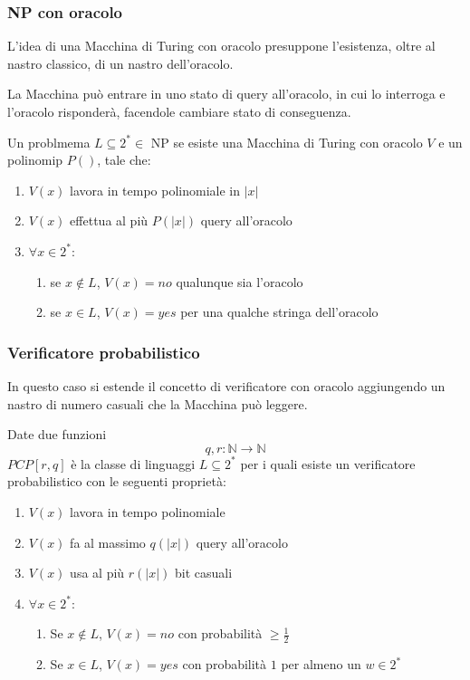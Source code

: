 \subsubsection{NP con oracolo}
L'idea di una Macchina di Turing con oracolo presuppone l'esistenza, oltre 
al nastro classico, di un nastro dell'oracolo.

La Macchina può entrare in uno stato di query all'oracolo, 
in cui lo interroga e l'oracolo risponderà, facendole cambiare stato di conseguenza.

\begin{theorem}
    Un problmema $L \subseteq 2^* \in $ NP se esiste una Macchina di Turing con oracolo $V$ e
    un polinomip $P()$, tale che:
    \begin{enumerate}
        \item $V(x)$ lavora in tempo polinomiale in $|x|$
        \item $V(x)$ effettua al più $P(|x|)$ query all'oracolo
        \item $\forall x \in 2^*$:
        \begin{enumerate}
            \item se $x \notin L$, $V(x) = no$ qualunque sia l'oracolo
            \item se $x \in L$, $V(x) = yes$ per una qualche stringa dell'oracolo
        \end{enumerate}
    \end{enumerate}
\end{theorem}

\subsubsection{Verificatore probabilistico}
In questo caso si estende il concetto di verificatore con 
oracolo aggiungendo un nastro di numero casuali che la Macchina può leggere.

Date due funzioni 
$$q,r : \mathbb{N} \longrightarrow \mathbb{N}$$
$PCP[r,q]$ è la classe di linguaggi $L \subseteq 2^*$ per i quali esiste un verificatore probabilistico
con le seguenti proprietà: 
\begin{enumerate}
    \item $V(x)$ lavora in tempo polinomiale
    \item $V(x)$ fa al massimo $q(|x|)$ query all'oracolo
    \item $V(x)$ usa al più $r(|x|)$ bit casuali
    \item $\forall x \in 2^*$:
    \begin{enumerate}
        \item Se $x \notin L$, $V(x) = no$ con probabilità $\geq \frac{1}{2}$
        \item Se $x \in L$, $V(x) = yes$ con probabilità $1$ per almeno
        un $w \in 2^*$
    \end{enumerate}
\end{enumerate}


